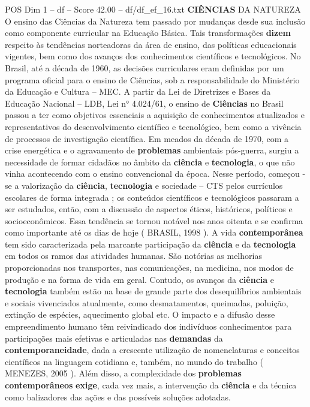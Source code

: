 \begin{textsample}{POS Dim 1 – df – Score 42.00 – df/df\_ef\_16.txt}  \label{ex:f1_pos_127}
\textbf{CIÊNCIAS} DA NATUREZA O ensino das Ciências da Natureza tem passado por mudanças desde sua inclusão como componente curricular na Educação Básica.
Tais transformações \textbf{dizem} respeito às tendências norteadoras da área de ensino, das políticas educacionais vigentes, bem como dos avanços dos conhecimentos científicos e tecnológicos.
No Brasil, até a década de 1960, as decisões curriculares eram definidas por um programa oficial para o ensino de Ciências, sob a responsabilidade do Ministério da Educação e Cultura – MEC.
A partir da Lei de Diretrizes e Bases da Educação Nacional – LDB, Lei n{\EmojiFont °} 4.024/61, o ensino de \textbf{Ciências} no Brasil passou a ter como objetivos essenciais a aquisição de conhecimentos atualizados e representativos do desenvolvimento científico e tecnológico, bem como a vivência de processos de investigação científica.
Em meados da década de 1970, com a crise energética e o agravamento de \textbf{problemas} ambientais pós-guerra, surgiu a necessidade de formar cidadãos no âmbito da \textbf{ciência} e \textbf{tecnologia}, o que não vinha acontecendo com o ensino convencional da época.
Nesse período, começou -se a valorização da \textbf{ciência}, \textbf{tecnologia} e sociedade – CTS pelos currículos escolares de forma integrada ; os conteúdos científicos e tecnológicos passaram a ser estudados, então, com a discussão de aspectos éticos, históricos, políticos e socioeconômicos.
Essa tendência se tornou notável nos anos oitenta e se confirma como importante até os dias de hoje ( BRASIL, 1998 ).
A vida \textbf{contemporânea} tem sido caracterizada pela marcante participação da \textbf{ciência} e da \textbf{tecnologia} em todos os ramos das atividades humanas.
São notórias as melhorias proporcionadas nos transportes, nas comunicações, na medicina, nos modos de produção e na forma de vida em geral.
Contudo, os avanços da \textbf{ciência} e \textbf{tecnologia} também estão na base de grande parte dos desequilíbrios ambientais e sociais vivenciados atualmente, como desmatamentos, queimadas, poluição, extinção de espécies, aquecimento global etc.
O impacto e a difusão desse empreendimento humano têm reivindicado dos indivíduos conhecimentos para participações mais efetivas e articuladas nas \textbf{demandas} da \textbf{contemporaneidade}, dada a crescente utilização de nomenclaturas e conceitos científicos na linguagem cotidiana e, também, no mundo do trabalho ( MENEZES, 2005 ).
Além disso, a complexidade dos \textbf{problemas} \textbf{contemporâneos} \textbf{exige}, cada vez mais, a intervenção da \textbf{ciência} e da técnica como balizadores das ações e das possíveis soluções adotadas.

\end{textsample}
